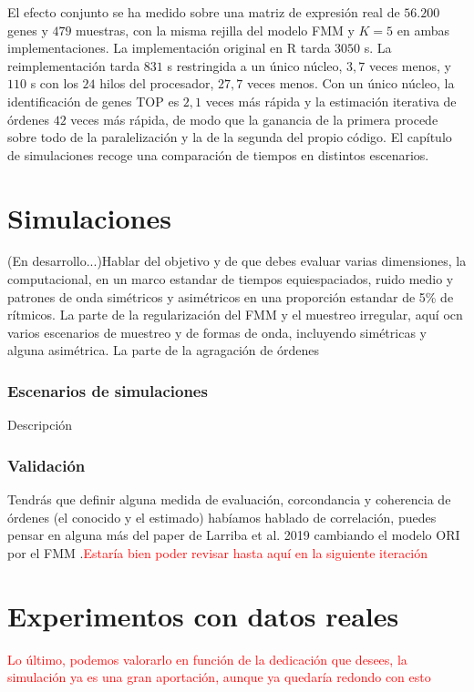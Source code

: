 \documentclass[12pt, a4paper]{report}
\begin{document}
El efecto conjunto se ha medido sobre una matriz de expresión real de \(56.200\) genes y \(479\) muestras, con la misma rejilla del modelo FMM y \(K=5\) en ambas implementaciones. La implementación original en R tarda \(3050\) s. La reimplementación tarda \(831\) s restringida a un único núcleo, \(3{,}7\) veces menos, y \(110\) s con los \(24\) hilos del procesador, \(27{,}7\) veces menos. Con un único núcleo, la identificación de genes TOP es \(2{,}1\) veces más rápida y la estimación iterativa de órdenes \(42\) veces más rápida, de modo que la ganancia de la primera procede sobre todo de la paralelización y la de la segunda del propio código. El capítulo de simulaciones recoge una comparación de tiempos en distintos escenarios.



\chapter{Simulaciones}
\label{cap:simulaciones}
(En desarrollo...)Hablar del objetivo y de que debes evaluar varias dimensiones, la computacional, en un marco estandar de tiempos equiespaciados, ruido medio y patrones de onda simétricos y asimétricos en una proporción estandar de 5\% de rítmicos. La parte de la regularización del FMM y el muestreo irregular, aquí ocn varios escenarios de muestreo y de formas de onda, incluyendo simétricas y alguna asimétrica. La parte de la agragación de órdenes 
\subsection{Escenarios de simulaciones}
Descripción
\subsection{Validación} Tendrás que definir alguna medida de evaluación, corcondancia y coherencia de órdenes (el conocido y el estimado) habíamos hablado de correlación, puedes pensar en alguna más del paper de Larriba et al. 2019 cambiando el modelo ORI por el FMM .\textcolor{red}{Estaría bien poder revisar hasta aquí en la siguiente iteración }
\chapter{Experimentos con datos reales}
\textcolor{red}{Lo último, podemos valorarlo en función de la dedicación que desees, la simulación ya es una gran aportación, aunque ya quedaría redondo con esto}
\end{document}
